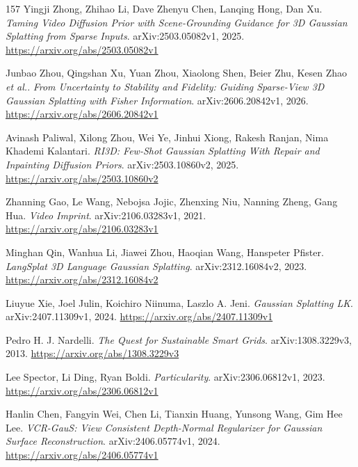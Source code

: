 \documentclass[11pt,a4paper]{article}
\begin{document}
\begin{thebibliography}{157}
Yingji Zhong, Zhihao Li, Dave Zhenyu Chen, Lanqing Hong, Dan Xu.
\newblock \emph{Taming Video Diffusion Prior with Scene-Grounding Guidance for 3D Gaussian Splatting from Sparse Inputs}.
\newblock arXiv:2503.05082v1, 2025.
\newblock \url{https://arxiv.org/abs/2503.05082v1}

Junbao Zhou, Qingshan Xu, Yuan Zhou, Xiaolong Shen, Beier Zhu, Kesen Zhao \emph{et al.}.
\newblock \emph{From Uncertainty to Stability and Fidelity: Guiding Sparse-View 3D Gaussian Splatting with Fisher Information}.
\newblock arXiv:2606.20842v1, 2026.
\newblock \url{https://arxiv.org/abs/2606.20842v1}

Avinash Paliwal, Xilong Zhou, Wei Ye, Jinhui Xiong, Rakesh Ranjan, Nima Khademi Kalantari.
\newblock \emph{RI3D: Few-Shot Gaussian Splatting With Repair and Inpainting Diffusion Priors}.
\newblock arXiv:2503.10860v2, 2025.
\newblock \url{https://arxiv.org/abs/2503.10860v2}

Zhanning Gao, Le Wang, Nebojsa Jojic, Zhenxing Niu, Nanning Zheng, Gang Hua.
\newblock \emph{Video Imprint}.
\newblock arXiv:2106.03283v1, 2021.
\newblock \url{https://arxiv.org/abs/2106.03283v1}

Minghan Qin, Wanhua Li, Jiawei Zhou, Haoqian Wang, Hanspeter Pfister.
\newblock \emph{LangSplat 3D Language Gaussian Splatting}.
\newblock arXiv:2312.16084v2, 2023.
\newblock \url{https://arxiv.org/abs/2312.16084v2}

Liuyue Xie, Joel Julin, Koichiro Niinuma, Laszlo A. Jeni.
\newblock \emph{Gaussian Splatting LK}.
\newblock arXiv:2407.11309v1, 2024.
\newblock \url{https://arxiv.org/abs/2407.11309v1}

Pedro H. J. Nardelli.
\newblock \emph{The Quest for Sustainable Smart Grids}.
\newblock arXiv:1308.3229v3, 2013.
\newblock \url{https://arxiv.org/abs/1308.3229v3}

Lee Spector, Li Ding, Ryan Boldi.
\newblock \emph{Particularity}.
\newblock arXiv:2306.06812v1, 2023.
\newblock \url{https://arxiv.org/abs/2306.06812v1}

Hanlin Chen, Fangyin Wei, Chen Li, Tianxin Huang, Yunsong Wang, Gim Hee Lee.
\newblock \emph{VCR-GauS: View Consistent Depth-Normal Regularizer for Gaussian Surface Reconstruction}.
\newblock arXiv:2406.05774v1, 2024.
\newblock \url{https://arxiv.org/abs/2406.05774v1}


\end{thebibliography}
\end{document}
